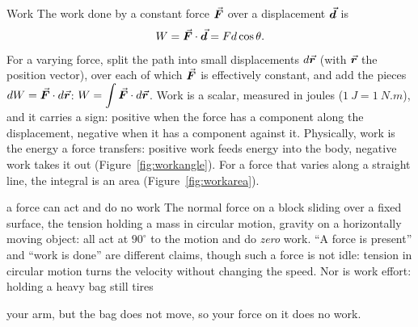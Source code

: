 \begin{defbox}{Work}
The work done by a constant force $\vec{\bm{F}}$ over a displacement $\vec{\bm{d}}$ is
\[
W=\vec{\bm{F}}\cdot\vec{\bm{d}}=Fd\cos\theta.
\]
For a varying force, split the path into small displacements $d\vec{\bm{r}}$ (with $\vec{\bm{r}}$ the position vector), over each of which $\vec{\bm{F}}$ is effectively
constant, and add the pieces $dW=\vec{\bm{F}}\cdot d\vec{\bm{r}}$: $W=\displaystyle\int \vec{\bm{F}}\cdot d\vec{\bm{r}}$. Work is a scalar,
measured in joules ($\SI{1}{J}=\SI{1}{N.m}$), and it carries a sign: positive when the force has a
component along the displacement, negative when it has a component against it. Physically, work is the
energy a force transfers: positive work feeds energy into the body, negative work takes it out
(Figure~\ref{fig:workangle}). For a force that varies along a straight line, the integral is an area
(Figure~\ref{fig:workarea}).
\end{defbox}

\begin{figure}[htbp]
\centering
{}
\end{figure}

\begin{trapbox}{a force can act and do no work}
The normal force on a block sliding over a fixed surface, the tension holding a mass in circular motion,
gravity on a horizontally moving object: all act at $90^\circ$ to the motion and do \emph{zero} work. ``A force is
present'' and ``work is done'' are different claims, though such a force is not idle: tension in circular
motion turns the velocity without changing the speed. Nor is work effort: holding a heavy bag still tires

your arm, but the bag does not move, so your force on it does no work.
\end{trapbox}

\begin{figure}[htbp]
\centering
{}
\end{figure}

